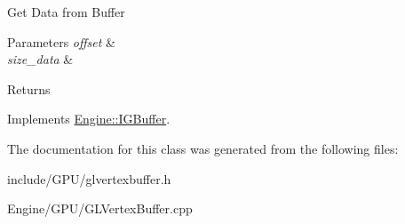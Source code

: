 Get Data from Buffer 
\begin{DoxyParams}{Parameters}
{\em offset} & \\
\hline
{\em size\+\_\+data} & \\
\hline
\end{DoxyParams}
\begin{DoxyReturn}{Returns}

\end{DoxyReturn}


Implements \hyperlink{classEngine_1_1IGBuffer_a8ad52dc670797d72aabf99033d20b220}{Engine\+::\+I\+G\+Buffer}.



The documentation for this class was generated from the following files\+:\begin{DoxyCompactItemize}
\item 
include/\+G\+P\+U/glvertexbuffer.\+h\item 
Engine/\+G\+P\+U/G\+L\+Vertex\+Buffer.\+cpp\end{DoxyCompactItemize}
